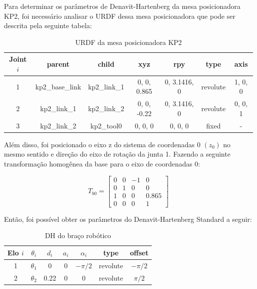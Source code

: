 \documentclass[10pt]{article}
\begin{document}
\quad Para determinar os parâmetros de Denavit-Hartenberg da mesa posicionadora KP2, foi necessário analisar o URDF dessa mesa posicionadora que pode ser descrita pela seguinte tabela:

\begin{table}[h!]
    \centering
    \begin{tabular}{|c|c|c|c|c|c|c|}
    \hline
    \textbf{Joint $i$} & \textbf{parent} & \textbf{child} & \textbf{xyz} & \textbf{rpy} & \textbf{type} & \textbf{axis} \\ \hline
    1 & kp2\_base\_link & kp2\_link\_1 & 0, 0, 0.865 & 0, 3.1416, 0 & revolute & 1, 0, 0 \\ \hline
    2 & kp2\_link\_1 & kp2\_link\_2 & 0, 0, -0.22 & 0, 3.1416, 0 & revolute & 0, 0, 1 \\ \hline
    3 & kp2\_link\_2 & kp2\_tool0 & 0, 0, 0 & 0, 0, 0 & fixed & - \\ \hline
    \end{tabular}
    \caption{URDF da mesa posicionadora KP2}
\end{table}

\quad Além disso, foi posicionado o eixo z do sistema de coordenadas 0 \((z_0)\) no mesmo sentido e direção do eixo de rotação da junta 1.
Fazendo a seguinte transformação homogênea da base para o eixo de coordenadas 0:

\begin{equation}
    T_{b0} = \begin{bmatrix}
        0 & 0 & -1 & 0 \\
        0 & 1 & 0 & 0 \\
        1 & 0 & 0 & 0.865 \\
        0 & 0 & 0 & 1 
        \end{bmatrix}
\end{equation}

\quad Então, foi possível obter os parâmetros do Denavit-Hartenberg Standard a seguir:

\begin{table}[h!]
    \centering
    \begin{tabular}{|c|c|c|c|c|c|c|}
    \hline
    \textbf{Elo $i$} & $\theta_i$ & $d_i$ & $a_i$ & $\alpha_i$ & \textbf{type} & \textbf{offset} \\ \hline
    1 & $\theta_1$ & 0 & 0 & $-\pi/2$ & revolute & $-\pi/2$ \\ \hline
    2 & $\theta_2$ & 0.22 & 0 & 0 & revolute & $\pi/2$ \\ \hline
    \end{tabular}
    \caption{DH do braço robótico}
\end{table}
\end{document}
